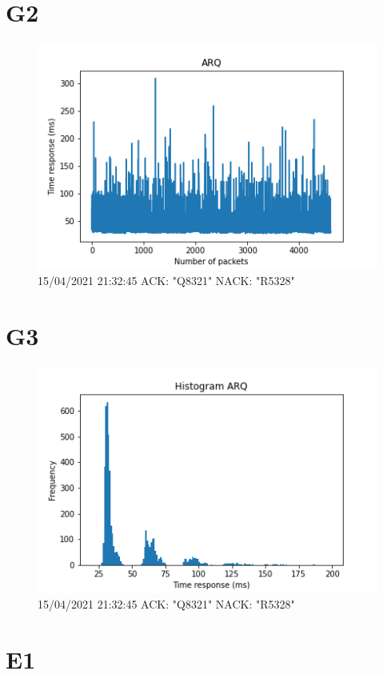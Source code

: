 \documentclass[hidelinks, 12pt, a4paper]{article}
\begin{document}
\pagebreak

\section{G2}

\begin{figure}[h!]
\centering
	\includegraphics[keepaspectratio, width=.8\textwidth]{arq.png}
	\caption{15/04/2021 21:32:45 ACK: "Q8321" NACK: "R5328"} 
\end{figure}


\section{G3}

\begin{figure}[h!]
\centering
	\includegraphics[keepaspectratio, width=.8\textwidth]{hist_arq.png}
	\caption{15/04/2021 21:32:45 ACK: "Q8321" NACK: "R5328"} 
\end{figure}

\pagebreak

\section{E1}
\end{document}
